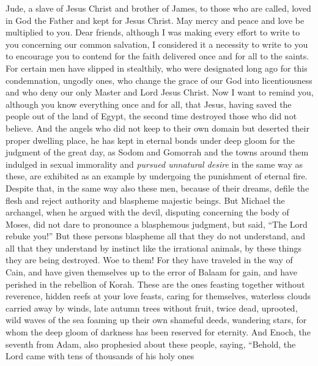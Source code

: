 
\begin{biblechapter} %
 Jude, a slave of Jesus Christ and brother of James, to those who are called, loved in God the Father and kept for Jesus Christ.
\verse May mercy and peace and love be multiplied to you.
 Dear friends, although I was making every effort to write to you concerning our common salvation, I considered it a necessity to write to you to encourage you to contend for the faith delivered once and for all to the saints.
\verse For certain men have slipped in stealthily, who were designated long ago for this condemnation, ungodly ones, who change the grace of our God into licentiousness and who deny our only Master and Lord Jesus Christ.
 Now I want to remind you, although you know everything once and for all, that Jesus, having saved the people out of the land of Egypt, the second time destroyed those who did not believe.
\verse And the angels who did not keep to their own domain but deserted their proper dwelling place, he has kept in eternal bonds under deep gloom for the judgment of the great day,
\verse as Sodom and Gomorrah and the towns around them indulged in sexual immorality and \textit{pursued unnatural desire} in the same way as these, are exhibited as an example by undergoing the punishment of eternal fire.
\verse Despite that, in the same way also these men, because of their dreams, defile the flesh and reject authority and blaspheme majestic beings.
\verse But Michael the archangel, when he argued with the devil, disputing concerning the body of Moses, did not dare to pronounce a blasphemous judgment, but said, “The Lord rebuke you!”
\verse But these persons blaspheme all that they do not understand, and all that they understand by instinct like the irrational animals, by these things they are being destroyed.
\verse Woe to them! For they have traveled in the way of Cain, and have given themselves up to the error of Balaam for gain, and have perished in the rebellion of Korah.
\verse These are the ones feasting together without reverence, hidden reefs at your love feasts, caring for themselves, waterless clouds carried away by winds, late autumn trees without fruit, twice dead, uprooted,
\verse wild waves of the sea foaming up their own shameful deeds, wandering stars, for whom the deep gloom of darkness has been reserved for eternity.
\verse And Enoch, the seventh from Adam, also prophesied about these people, saying, “Behold, the Lord came with tens of thousands of his holy ones

\end{biblechapter}
